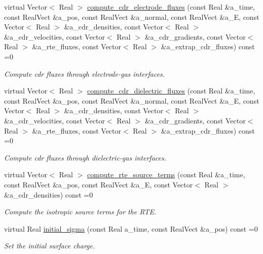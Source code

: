 \begin{DoxyCompactItemize}
virtual Vector$<$ Real $>$ \hyperlink{classplasma__kinetics_aaf57b4f8de7bca267612c145fe88dbe5}{compute\+\_\+cdr\+\_\+electrode\+\_\+fluxes} (const Real \&a\+\_\+time, const Real\+Vect \&a\+\_\+pos, const Real\+Vect \&a\+\_\+normal, const Real\+Vect \&a\+\_\+E, const Vector$<$ Real $>$ \&a\+\_\+cdr\+\_\+densities, const Vector$<$ Real $>$ \&a\+\_\+cdr\+\_\+velocities, const Vector$<$ Real $>$ \&a\+\_\+cdr\+\_\+gradients, const Vector$<$ Real $>$ \&a\+\_\+rte\+\_\+fluxes, const Vector$<$ Real $>$ \&a\+\_\+extrap\+\_\+cdr\+\_\+fluxes) const =0
\begin{DoxyCompactList}\small\item\em Compute cdr fluxes through electrode-\/gas interfaces. \end{DoxyCompactList}\item 
virtual Vector$<$ Real $>$ \hyperlink{classplasma__kinetics_aad7ce22791f29136fe3783acdc5fe239}{compute\+\_\+cdr\+\_\+dielectric\+\_\+fluxes} (const Real \&a\+\_\+time, const Real\+Vect \&a\+\_\+pos, const Real\+Vect \&a\+\_\+normal, const Real\+Vect \&a\+\_\+E, const Vector$<$ Real $>$ \&a\+\_\+cdr\+\_\+densities, const Vector$<$ Real $>$ \&a\+\_\+cdr\+\_\+velocities, const Vector$<$ Real $>$ \&a\+\_\+cdr\+\_\+gradients, const Vector$<$ Real $>$ \&a\+\_\+rte\+\_\+fluxes, const Vector$<$ Real $>$ \&a\+\_\+extrap\+\_\+cdr\+\_\+fluxes) const =0
\begin{DoxyCompactList}\small\item\em Compute cdr fluxes through dielectric-\/gas interfaces. \end{DoxyCompactList}\item 
virtual Vector$<$ Real $>$ \hyperlink{classplasma__kinetics_a4d3abed4119273682697f70d83bb8377}{compute\+\_\+rte\+\_\+source\+\_\+terms} (const Real \&a\+\_\+time, const Real\+Vect \&a\+\_\+pos, const Real\+Vect \&a\+\_\+E, const Vector$<$ Real $>$ \&a\+\_\+cdr\+\_\+densities) const =0
\begin{DoxyCompactList}\small\item\em Compute the isotropic source terms for the R\+TE. \end{DoxyCompactList}\item 
virtual Real \hyperlink{classplasma__kinetics_ab84256b4cef8d2d6adbb3b7f0e3c6916}{initial\+\_\+sigma} (const Real a\+\_\+time, const Real\+Vect \&a\+\_\+pos) const =0
\begin{DoxyCompactList}\small\item\em Set the initial surface charge. \end{DoxyCompactList}\item 

\end{DoxyCompactItemize}

